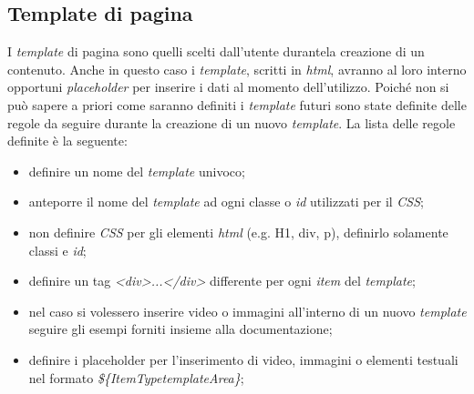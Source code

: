 \subsection{Template di pagina}
I \textit{template} di pagina sono quelli scelti dall'utente durantela creazione di un contenuto.
Anche in questo caso i \textit{template}, scritti in \textit{html}, avranno al loro interno opportuni \textit{placeholder} per inserire i dati al momento dell'utilizzo. Poiché non si può sapere a priori come saranno definiti i \textit{template} futuri sono state definite delle regole da seguire durante la creazione di un nuovo \textit{template}. La lista delle regole definite è la seguente:
\begin{itemize}
    \item definire un nome del \textit{template} univoco;
    \item anteporre il nome del \textit{template} ad ogni classe o \textit{id} utilizzati per il \textit{CSS};
    \item non definire \textit{CSS} per gli elementi \textit{html} (e.g. H1, div, p), definirlo solamente classi e \textit{id};
    \item definire un tag \textit{<div>...</div>} differente per ogni \textit{item} del \textit{template};
    \item nel caso si volessero inserire video o immagini all'interno di un nuovo \textit{template} seguire gli esempi forniti insieme alla documentazione;
    \item definire i placeholder per l'inserimento di video, immagini o elementi testuali nel formato \textit{\$\{ItemType\textit{template}Area\}};
\end{itemize}

